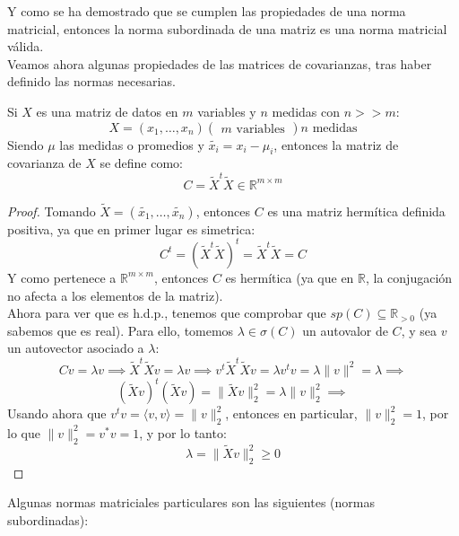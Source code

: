Y como se ha demostrado que se cumplen las propiedades de una norma matricial, entonces la norma subordinada de una matriz es una norma matricial válida.\\

Veamos ahora algunas propiedades de las matrices de covarianzas, tras haber definido las normas necesarias.

\begin{proposición}
    Si $ X $ es una matriz de datos en $m$ variables y $n$ medidas con $n >> m$:
    \[
        X =
        (x_1, \ldots, x_n) 
        \begin{pmatrix}
            m \text{ variables}
        \end{pmatrix}
        n \text{ medidas}
    \]
    Siendo $\mu$ las medidas o promedios y $\widetilde{x_i} = x_i - \mu_i$, entonces la matriz de covarianza de $X$ se define como:
    \[
        C =
        \widetilde{X}^t \widetilde{X} \in \mathbb{R}^{m \times m}
    \]
\end{proposición}

\begin{proof}
    Tomando $\widetilde{X} = (\widetilde{x_1}, \ldots, \widetilde{x_n})$, entonces $C$ es una matriz hermítica definida positiva, ya que en primer lugar es simetrica:
    \[
        C^t =
        (\widetilde{X}^t \widetilde{X})^t =
        \widetilde{X}^t \widetilde{X} = C
    \]
    Y como pertenece a $\mathbb{R}^{m \times m}$, entonces $C$ es hermítica (ya que en $\mathbb{R}$, la conjugación no afecta a los elementos de la matriz).\\
    Ahora para ver que es h.d.p., tenemos que comprobar que $sp(C) \subseteq \mathbb{R}_{>0}$ (ya sabemos que es real). Para ello, tomemos $\lambda \in \sigma(C)$ un autovalor de $C$, y sea $v$ un autovector asociado a $\lambda$:
    \[
        Cv = \lambda v \implies
        \widetilde{X}^t \widetilde{X} v = \lambda v \implies
        v^t \widetilde{X}^t \widetilde{X} v = \lambda v^t v = \lambda \|v\|^2 = \lambda \implies
    \]
    \[
        \left( \widetilde{X} v \right)^t \left( \widetilde{X} v \right) =\| \widetilde{X} v \|^2_2 = \lambda \| v\|^2_2 \implies
    \]
    Usando ahora que $v^t v = \langle v, v \rangle = \|v\|^2_2$, entonces en particular, $ \|v\|^2_2 = 1 $, por lo que $ \| v \|^2_2 = v^* v = 1 $, y por lo tanto:
    \[
        \lambda = \| \widetilde{X} v \|^2_2 \geq 0
    \]
\end{proof}

Algunas normas matriciales particulares son las siguientes (normas subordinadas):

